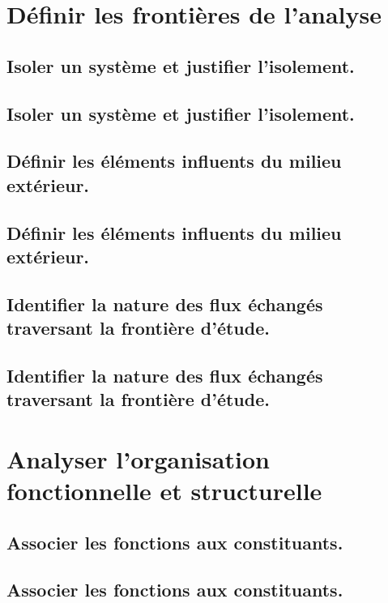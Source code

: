 \documentclass[10pt,fleqn]{book}
\begin{document}
\section{Définir les frontières de l'analyse} 

\subsection{Isoler un système et justifier l’isolement.} 

\subsection{Isoler un système et justifier l’isolement.} 

\subsection{Définir les éléments influents du milieu extérieur. } 

\subsection{Définir les éléments influents du milieu extérieur. } 

\subsection{Identifier la nature des flux échangés traversant la frontière d’étude.} 

\subsection{Identifier la nature des flux échangés traversant la frontière d’étude.} 

\section{Analyser l'organisation fonctionnelle et structurelle} 

\subsection{Associer les fonctions aux constituants.} 

\subsection{Associer les fonctions aux constituants.} 
\end{document}
